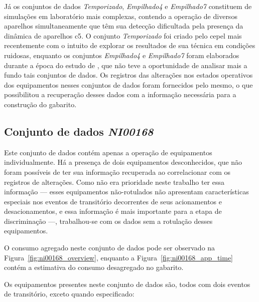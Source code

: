 Já os conjuntos de dados \emph{Temporizado}, \emph{Empilhado4} e
\emph{Empilhado7} constituem de simulações em laboratório mais
complexas, contendo a operação de diversos aparelhos simultaneamente
que têm sua detecção dificultada pela presença da dinâmica de
aparelhos \acs{c5}. O conjunto \emph{Temporizado} foi criado pelo
\acs{cepel} mais recentemente com o intuito de explorar os resultados
de sua técnica em condições ruidosas, enquanto os conjuntos
\emph{Empilhado4} e \emph{Empilhado7} foram elaborados durante a época
do estudo de \citeauthor*{nilm_cepel_alvaro}, que não teve a
oportunidade de analisar mais a fundo tais conjuntos de dados. Os
registros das alterações nos estados operativos dos equipamentos
nesses conjuntos de dados foram fornecidos pelo mesmo, o que
possibilitou a recuperação desses dados com a informação necessária
para a construção do gabarito.

\subsection{Conjunto de dados \emph{NI00168}}

Este conjunto de dados contém apenas a operação de equipamentos
individualmente. Há a presença de dois equipamentos desconhecidos, que
não foram possíveis de ter sua informação recuperada ao correlacionar
com os registros de alterações. Como não era prioridade neste trabalho
ter essa informação --- esses equipamentos não-rotulados não
apresentam características especiais nos eventos de transitório
decorrentes de seus acionamentos e desacionamentos, e essa informação
é mais importante para a etapa de discriminação ---, trabalhou-se com
os dados sem a rotulação desses equipamentos.

O consumo agregado neste conjunto de dados pode ser observado na
Figura~\ref{fig:ni00168_overview}, enquanto a
Figura~\ref{fig:ni00168_app_time} contém a estimativa do consumo
desagregado no gabarito.

Os equipamentos presentes neste conjunto de dados são, todos com dois
eventos de transitório, exceto quando especificado:

